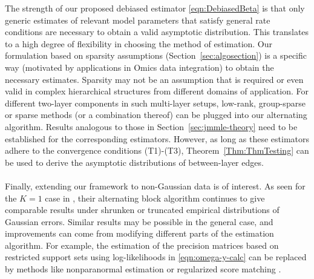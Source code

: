 The strength of our proposed debiased estimator \eqref{eqn:DebiasedBeta} is that only generic estimates of relevant model parameters that satisfy general rate conditions are necessary to obtain a valid asymptotic distribution. This translates to a high degree of flexibility in choosing the method of estimation. Our formulation based on sparsity assumptions (Section~\ref{sec:algosection}) is a specific way (motivated by applications in Omics data integration) to obtain the necessary estimates. Sparsity may not be an assumption that is required or even valid in complex hierarchical structures from different domains of application. For different two-layer components in such multi-layer setups, low-rank, group-sparse or sparse methods (or a combination thereof) can be plugged into our alternating algorithm. Results analogous to those in Section~\ref{sec:jmmle-theory} need to be established for the corresponding estimators. However, as long as these estimators adhere to the convergence conditions (T1)-(T3), Theorem~\ref{Thm:ThmTesting} can be used to derive the asymptotic distributions of between-layer edges.

\paragraph{}
Finally, extending our framework to non-Gaussian data is of interest. As seen for the $K=1$ case in \citet{LinEtal16}, their alternating block algorithm continues to give comparable results under shrunken or truncated empirical distributions of Gaussian errors. Similar results may be possible in the general case, and improvements can come from modifying different parts of the estimation algorithm. For example, the estimation of the precision matrices based on restricted support sets using log-likelihoods in \eqref{eqn:omega-y-calc} can be replaced by methods like nonparanormal estimation \citep{LiuLaffertyWasserman09} or regularized score matching \citep{LinDrtonShojaie16}.